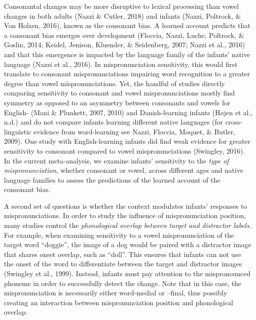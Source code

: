 \documentclass[man]{apa6}
\begin{document}
Consonantal changes may be more disruptive to lexical processing than vowel changes in both adults (Nazzi \& Cutler, 2018) and infants (Nazzi, Poltrock, \& Von Holzen, 2016), known as the consonant bias. A learned account predicts that a consonant bias emerges over development (Floccia, Nazzi, Luche, Poltrock, \& Goslin, 2014; Keidel, Jenison, Kluender, \& Seidenberg, 2007; Nazzi et al., 2016) and that this emergence is impacted by the language family of the infants' native language (Nazzi et al., 2016). In mispronunciation sensitivity, this would first translate to consonant mispronunciations impairing word recognition to a greater degree than vowel mispronunciations. Yet, the handful of studies directly comparing sensitivity to consonant and vowel mispronunciations mostly find symmetry as opposed to an asymmetry between consonants and vowels for English- (Mani \& Plunkett, 2007, 2010) and Danish-learning infants (Højen et al., n.d.) and do not compare infants learning different native languages (for cross-linguistic evidence from word-learning see Nazzi, Floccia, Moquet, \& Butler, 2009). One study with English-learning infants did find weak evidence for greater sensitivity to consonant compared to vowel mispronunciations (Swingley, 2016). In the current meta-analysis, we examine infants' sensitivity to the \emph{type of mispronunciation}, whether consonant or vowel, across different ages and native language families to assess the predictions of the learned account of the consonant bias.

A second set of questions is whether the context modulates infants' responses to mispronunciations. In order to study the influence of mispronunciation position, many studies control the \emph{phonological overlap between target and distractor labels}. For example, when examining sensitivity to a vowel mispronunciation of the target word \enquote{doggie}, the image of a dog would be paired with a distractor image that shares onset overlap, such as \enquote{doll}. This ensures that infants can not use the onset of the word to differentiate between the target and distractor images (Swingley et al., 1999). Instead, infants must pay attention to the mispronounced phoneme in order to successfully detect the change. Note that in this case, the mispronunciation is necessarily either word-medial or --final, thus possibly creating an interaction between mispronunciation position and phonological overlap.
\end{document}
